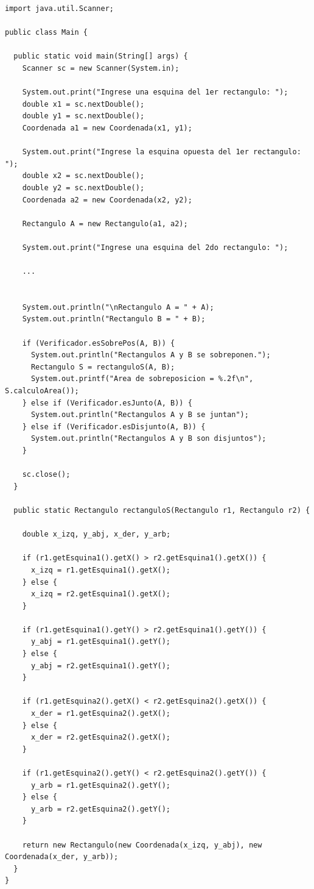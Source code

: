 \documentclass[12pt]{article}
\begin{document}
\begin{enumerate}
\begin{verbatim}
import java.util.Scanner;

public class Main {

  public static void main(String[] args) {
    Scanner sc = new Scanner(System.in);

    System.out.print("Ingrese una esquina del 1er rectangulo: ");
    double x1 = sc.nextDouble();
    double y1 = sc.nextDouble();
    Coordenada a1 = new Coordenada(x1, y1);

    System.out.print("Ingrese la esquina opuesta del 1er rectangulo: ");
    double x2 = sc.nextDouble();
    double y2 = sc.nextDouble();
    Coordenada a2 = new Coordenada(x2, y2);

    Rectangulo A = new Rectangulo(a1, a2);

    System.out.print("Ingrese una esquina del 2do rectangulo: ");

    ...


    System.out.println("\nRectangulo A = " + A);
    System.out.println("Rectangulo B = " + B);
        
    if (Verificador.esSobrePos(A, B)) {
      System.out.println("Rectangulos A y B se sobreponen.");
      Rectangulo S = rectanguloS(A, B);
      System.out.printf("Area de sobreposicion = %.2f\n", S.calculoArea());
    } else if (Verificador.esJunto(A, B)) {
      System.out.println("Rectangulos A y B se juntan");
    } else if (Verificador.esDisjunto(A, B)) {
      System.out.println("Rectangulos A y B son disjuntos");
    }

    sc.close();
  }

  public static Rectangulo rectanguloS(Rectangulo r1, Rectangulo r2) {

    double x_izq, y_abj, x_der, y_arb;

    if (r1.getEsquina1().getX() > r2.getEsquina1().getX()) {
      x_izq = r1.getEsquina1().getX();
    } else {
      x_izq = r2.getEsquina1().getX();
    }

    if (r1.getEsquina1().getY() > r2.getEsquina1().getY()) {
      y_abj = r1.getEsquina1().getY();
    } else {
      y_abj = r2.getEsquina1().getY();
    }

    if (r1.getEsquina2().getX() < r2.getEsquina2().getX()) {
      x_der = r1.getEsquina2().getX();
    } else {
      x_der = r2.getEsquina2().getX();
    }

    if (r1.getEsquina2().getY() < r2.getEsquina2().getY()) {
      y_arb = r1.getEsquina2().getY();
    } else {
      y_arb = r2.getEsquina2().getY();
    }

    return new Rectangulo(new Coordenada(x_izq, y_abj), new Coordenada(x_der, y_arb));
  }
}

\end{verbatim}
    

    

\end{enumerate}
\end{document}
